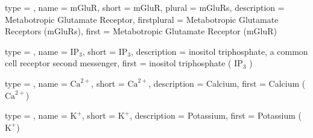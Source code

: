 {
	type        = \acronymtype,
	name        = {mGluR},
	short       = {mGluR},
    plural      = {mGluRs},
	description = {Metabotropic Glutamate Receptor},
	firstplural = {Metabotropic Glutamate Receptors (mGluRs)},
	first       = {Metabotropic Glutamate Receptor (mGluR)}
}

{
	type        = \acronymtype,
	name        = {$\textrm{IP}_3$},
	short       = {$\textrm{IP}_3$},
	description = {inositol triphosphate, a common cell receptor second messenger},
	first = {inositol triphosphate ( $\textrm{IP}_3$ )}
}

{
	type        = \acronymtype,
    name        = {$\textrm{Ca}^{2+}$},
	short       = {$\textrm{Ca}^{2+}$},
	description = {Calcium},
	first = {Calcium ($\textrm{Ca}^{2+}$)}
}

{
	type        = \acronymtype,
	name        = {$\textrm{K}^{+}$},
	short       = {$\textrm{K}^{+}$},
	description = {Potassium},
	first = {Potassium ($\textrm{K}^{+}$)}
}


